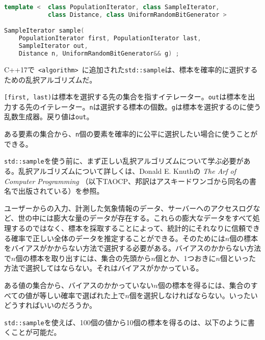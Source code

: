 %

\bgroup
\begin{lstlisting}[language=C++]
template <  class PopulationIterator, class SampleIterator,
            class Distance, class UniformRandomBitGenerator >

SampleIterator sample(
    PopulationIterator first, PopulationIterator last,
    SampleIterator out,
    Distance n, UniformRandomBitGenerator&& g) ;
\end{lstlisting}
\egroup

C++17で~\lstinline!<algorithm>!~に追加された\lstinline!std::sample!は、標本を確率的に選択するための乱択アルゴリズムだ。

\lstinline![first, last)!は標本を選択する先の集合を指すイテレーター。\lstinline!out!は標本を出力する先のイテレーター。\lstinline!n!は選択する標本の個数。\lstinline!g!は標本を選択するのに使う乱数生成器。戻り値は\lstinline!out!。

ある要素の集合から、\lstinline!n!個の要素を確率的に公平に選択したい場合に使うことができる。

%

\lstinline!std::sample!を使う前に、まず正しい乱択アルゴリズムについて学ぶ必要がある。乱択アルゴリズムについて詳しくは、Donald
E. Knuthの \emph{The Arf of Computer Programming}
（以下TAOCP、邦訳はアスキードワンゴから同名の書名で出版されている）を参照。

ユーザーからの入力、計測した気象情報のデータ、サーバーへのアクセスログなど、世の中には膨大な量のデータが存在する。これらの膨大なデータをすべて処理するのではなく、標本を採取することによって、統計的にそれなりに信頼できる確率で正しい全体のデータを推定することができる。そのためには\(n\)個の標本をバイアスがかからない方法で選択する必要がある。バイアスのかからない方法で\(n\)個の標本を取り出すには、集合の先頭から\(n\)個とか、1つおきに\(n\)個といった方法で選択してはならない。それはバイアスがかかっている。

ある値の集合から、バイアスのかかっていない\(n\)個の標本を得るには、集合のすべての値が等しい確率で選ばれた上で\(n\)個を選択しなければならない。いったいどうすればいいのだろうか。

\lstinline!std::sample!を使えば、100個の値から10個の標本を得るのは、以下のように書くことが可能だ。

